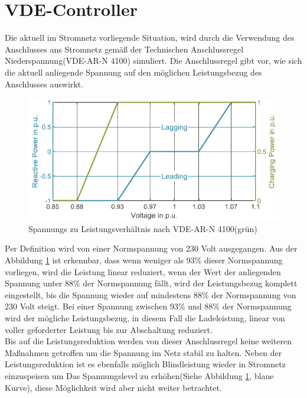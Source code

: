 \section{VDE-Controller}
\label{cap:background_sec:pureVDE}
Die aktuell im Stromnetz vorliegende Situation, wird durch die Verwendung des Anschlusses ans Stromnetz gemäß der Technischen Anschlussregel Niederspannung(VDE-AR-N 4100) simuliert. Die Anschlussregel gibt vor, wie sich die aktuell anliegende Spannung auf den möglichen Leistungsbezug des Anschlusses auswirkt. \\
\begin{figure}[h!]
	\includegraphics[width=\linewidth]{img/VDEGraph.png}
	\caption{Spannungs zu Leistungsverhältnis nach VDE-AR-N 4100(grün)}
	\label{Abb_VDEController}
\end{figure}
Per Definition wird von einer Normspannung von 230 Volt ausgegangen. Aus der Abbildung \ref{Abb_VDEController} ist erkennbar, dass wenn weniger als 93\% dieser Normspannung vorliegen, wird die Leistung linear reduziert, wenn der Wert der anliegenden Spannung unter 88\% der Normspannung fällt, wird der Leistungsbezug komplett eingestellt, bis die Spannung wieder auf mindestens 88\% der Normspannung von 230 Volt steigt. Bei einer Spannung zwischen 93\% und 88\% der Normspannung wird der mögliche Leistungsbezug, in diesem Fall die Ladeleistung, linear von voller geforderter Leistung bis zur Abschaltung reduziert.\\
Bis auf die Leistungsreduktion werden von dieser Anschlussregel keine weiteren Maßnahmen getroffen um die Spannung im Netz stabil zu halten. 
Neben der Leistungsreduktion ist es ebenfalls möglich Blindleistung wieder in Stromnetz einzuspeisen um Das Spannungslevel zu erhöhen(Siehe Abbildung \ref{Abb_VDEController}, blaue Kurve), diese Möglichkeit wird aber nicht weiter betrachtet.

